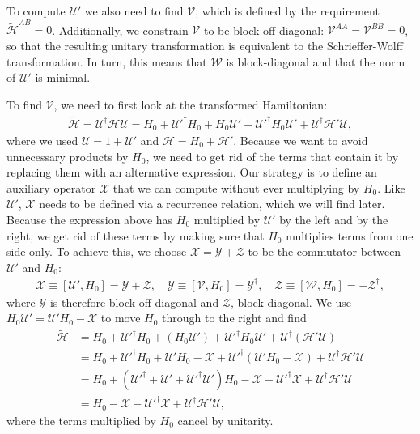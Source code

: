 To compute $\mathcal{U}'$ we also need to find $\mathcal{V}$, which is defined
by the requirement $\tilde{\mathcal{H}}^{AB} = 0$.
Additionally, we constrain $\mathcal{V}$ to be block off-diagonal:
$\mathcal{V}^{AA} = \mathcal{V}^{BB} = 0$,
so that the resulting unitary transformation is equivalent to the
Schrieffer-Wolff transformation.
In turn, this means that $\mathcal{W}$ is block-diagonal and that the norm
of $\mathcal{U}'$ is minimal.

To find $\mathcal{V}$, we need to first look at the transformed Hamiltonian:
%
\begin{align}
\tilde{\mathcal{H}} = \mathcal{U}^\dagger \mathcal{H} \mathcal{U} = H_0 +
\mathcal{U}'^\dagger H_0 + H_0 \mathcal{U}' + \mathcal{U}'^\dagger H_0
\mathcal{U}' + \mathcal{U}^\dagger\mathcal{H'}\mathcal{U},
\end{align}
%
where we used $\mathcal{U}=1+\mathcal{U}'$ and $\mathcal{H} = H_0 +
\mathcal{H'}$.
Because we want to avoid unnecessary products by $H_0$, we need to get rid of
the terms that contain it by replacing them with an alternative expression.
Our strategy is to define an auxiliary operator $\mathcal{X}$ that we can
compute without ever multiplying by $H_0$.
Like $\mathcal{U}'$, $\mathcal{X}$ needs to be defined via a recurrence
relation, which we will find later.
Because the expression above has $H_0$ multiplied by $\mathcal{U}'$ by the left
and by the right, we get rid of these terms by making sure that $H_0$
multiplies terms from one side only.
To achieve this, we choose $\mathcal{X}=\mathcal{Y}+\mathcal{Z}$ to be the commutator between
$\mathcal{U}'$ and $H_0$:
%
\begin{align}
\label{eq:XYZ}
\mathcal{X} \equiv [\mathcal{U}', H_0] = \mathcal{Y} + \mathcal{Z}, \quad
\mathcal{Y} \equiv [\mathcal{V}, H_0] = \mathcal{Y}^\dagger,\quad
\mathcal{Z} \equiv [\mathcal{W}, H_0] = -\mathcal{Z}^\dagger,
\end{align}
%
where $\mathcal{Y}$ is therefore block off-diagonal and $\mathcal{Z}$, block
diagonal.
We use $H_0 \mathcal{U}' = \mathcal{U}' H_0 -\mathcal{X}$ to move $H_0$ through
to the right and find
%
\begin{align}
\label{eq:H_tilde}
  \tilde{\mathcal{H}}
  &= H_0 + \mathcal{U}'^\dagger H_0 + (H_0 \mathcal{U}') + \mathcal{U}'^\dagger H_0
  \mathcal{U}' + \mathcal{U}^\dagger(\mathcal{H'}\mathcal{U}) \nonumber
  \\
  &= H_0 + \mathcal{U}'^\dagger H_0 + \mathcal{U}'H_0 - \mathcal{X} + \mathcal{U}'^\dagger (\mathcal{U}' H_0 - \mathcal{X}) + \mathcal{U}^\dagger\mathcal{H'}\mathcal{U} \nonumber \\
  &= H_0 + (\mathcal{U}'^\dagger + \mathcal{U}' + \mathcal{U}'^\dagger \mathcal{U}')H_0 - \mathcal{X} - \mathcal{U}'^\dagger \mathcal{X} + \mathcal{U}^\dagger\mathcal{H'}\mathcal{U} \nonumber \\
  &= H_0 - \mathcal{X} - \mathcal{U}'^\dagger \mathcal{X} + \mathcal{U}^\dagger\mathcal{H'}\mathcal{U},
\end{align}
%
where the terms multiplied by $H_0$ cancel by unitarity.

